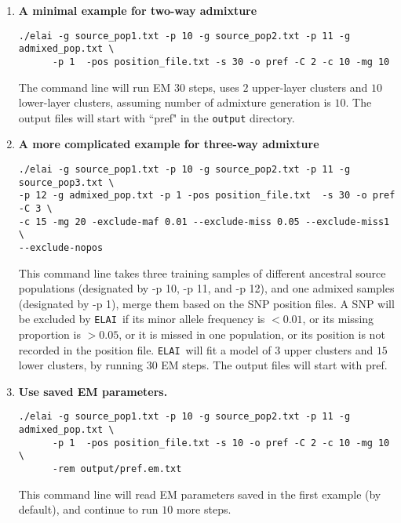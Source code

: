 \documentclass[11pt,Palatino]{article}
\def\elai{{\tt{ELAI}}~}
\begin{document}
\begin{enumerate}
\item {\bf A minimal example for two-way admixture} 
\begin{verbatim}
./elai -g source_pop1.txt -p 10 -g source_pop2.txt -p 11 -g admixed_pop.txt \
      -p 1  -pos position_file.txt -s 30 -o pref -C 2 -c 10 -mg 10 
\end{verbatim}
The command line will run EM $30$ steps, uses $2$ upper-layer clusters and $10$ lower-layer clusters, assuming number of admixture generation is $10$. The output files will start with ``pref" in the {\tt output} directory.  

\item {\bf A more complicated example for three-way admixture}
\begin{verbatim}
./elai -g source_pop1.txt -p 10 -g source_pop2.txt -p 11 -g source_pop3.txt \
-p 12 -g admixed_pop.txt -p 1 -pos position_file.txt  -s 30 -o pref -C 3 \ 
-c 15 -mg 20 -exclude-maf 0.01 --exclude-miss 0.05 --exclude-miss1 \ 
--exclude-nopos 
\end{verbatim}
This command line takes three training samples of different ancestral source populations (designated by -p 10, -p 11, and -p 12), and one admixed samples (designated by -p 1),  merge them based on the SNP position files. 
A SNP will be excluded by \elai if its minor allele frequency is $<0.01$, or its missing proportion is $>0.05$, or it is missed in one population, or its position is not recorded in the position file. 
\elai will fit a model of $3$ upper clusters and $15$ lower clusters, by running $30$ EM steps.  The output files will start with pref. 
   
\item {\bf Use saved EM parameters.} 
\begin{verbatim}
./elai -g source_pop1.txt -p 10 -g source_pop2.txt -p 11 -g admixed_pop.txt \
      -p 1  -pos position_file.txt -s 10 -o pref -C 2 -c 10 -mg 10  \
      -rem output/pref.em.txt
\end{verbatim}
This command line will read EM parameters saved in the first example (by default), and continue to run $10$ more steps. 
   

\end{enumerate}
\end{document}
